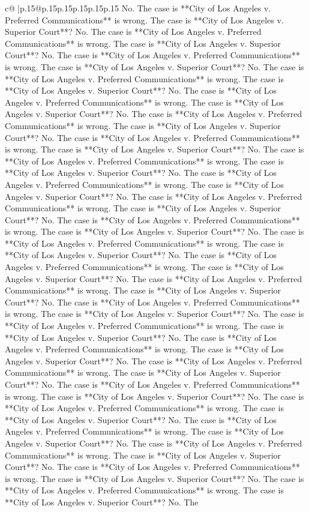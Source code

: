 \documentclass{article}
\begin{document}
{\begin{supertabular}{c@{$\;$}|p{.15\linewidth}@{}p{.15\linewidth}p{.15\linewidth}p{.15\linewidth}p{.15\linewidth}p{.15\linewidth}}
{{{No. The case is **City of Los Angeles v. Preferred Communications** is wrong. The case is **City of Los Angeles v. Superior Court**? No. The case is **City of Los Angeles v. Preferred Communications** is wrong. The case is **City of Los Angeles v. Superior Court**? No. The case is **City of Los Angeles v. Preferred Communications** is wrong. The case is **City of Los Angeles v. Superior Court**? No. The case is **City of Los Angeles v. Preferred Communications** is wrong. The case is **City of Los Angeles v. Superior Court**? No. The case is **City of Los Angeles v. Preferred Communications** is wrong. The case is **City of Los Angeles v. Superior Court**? No. The case is **City of Los Angeles v. Preferred Communications** is wrong. The case is **City of Los Angeles v. Superior Court**? No. The case is **City of Los Angeles v. Preferred Communications** is wrong. The case is **City of Los Angeles v. Superior Court**? No. The case is **City of Los Angeles v. Preferred Communications** is wrong. The case is **City of Los Angeles v. Superior Court**? No. The case is **City of Los Angeles v. Preferred Communications** is wrong. The case is **City of Los Angeles v. Superior Court**? No. The case is **City of Los Angeles v. Preferred Communications** is wrong. The case is **City of Los Angeles v. Superior Court**? No. The case is **City of Los Angeles v. Preferred Communications** is wrong. The case is **City of Los Angeles v. Superior Court**? No. The case is **City of Los Angeles v. Preferred Communications** is wrong. The case is **City of Los Angeles v. Superior Court**? No. The case is **City of Los Angeles v. Preferred Communications** is wrong. The case is **City of Los Angeles v. Superior Court**? No. The case is **City of Los Angeles v. Preferred Communications** is wrong. The case is **City of Los Angeles v. Superior Court**? No. The case is **City of Los Angeles v. Preferred Communications** is wrong. The case is **City of Los Angeles v. Superior Court**? No. The case is **City of Los Angeles v. Preferred Communications** is wrong. The case is **City of Los Angeles v. Superior Court**? No. The case is **City of Los Angeles v. Preferred Communications** is wrong. The case is **City of Los Angeles v. Superior Court**? No. The case is **City of Los Angeles v. Preferred Communications** is wrong. The case is **City of Los Angeles v. Superior Court**? No. The case is **City of Los Angeles v. Preferred Communications** is wrong. The case is **City of Los Angeles v. Superior Court**? No. The case is **City of Los Angeles v. Preferred Communications** is wrong. The case is **City of Los Angeles v. Superior Court**? No. The case is **City of Los Angeles v. Preferred Communications** is wrong. The case is **City of Los Angeles v. Superior Court**? No. The case is **City of Los Angeles v. Preferred Communications** is wrong. The case is **City of Los Angeles v. Superior Court**? No. The case is **City of Los Angeles v. Preferred Communications** is wrong. The case is **City of Los Angeles v. Superior Court**? No. The case is **City of Los Angeles v. Preferred Communications** is wrong. The case is **City of Los Angeles v. Superior Court**? No. The }}}
\end{supertabular}}
\end{document}
